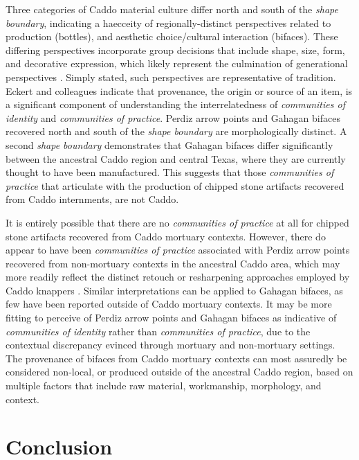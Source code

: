 \documentclass[smallextended]{svjour3}       %
\begin{document}
Three categories of Caddo material culture differ north and south of the
\emph{shape boundary}, indicating a haecceity of regionally-distinct
perspectives related to production (bottles), and aesthetic
choice/cultural interaction (bifaces). These differing perspectives
incorporate group decisions that include shape, size, form, and
decorative expression, which likely represent the culmination of
generational perspectives \cite{RN5610}. Simply stated, such
perspectives are representative of tradition. Eckert and colleagues
\cite{RN8061} indicate that provenance, the origin or source of an item,
is a significant component of understanding the interrelatedness of
\emph{communities of identity} and \emph{communities of practice}.
Perdiz arrow points and Gahagan bifaces recovered north and south of the
\emph{shape boundary} are morphologically distinct. A second \emph{shape
boundary} demonstrates that Gahagan bifaces differ significantly between
the ancestral Caddo region and central Texas, where they are currently
thought to have been manufactured. This suggests that those
\emph{communities of practice} that articulate with the production of
chipped stone artifacts recovered from Caddo internments, are not Caddo.

It is entirely possible that there are no \emph{communities of practice}
at all for chipped stone artifacts recovered from Caddo mortuary
contexts. However, there do appear to have been \emph{communities of
practice} associated with Perdiz arrow points recovered from
non-mortuary contexts in the ancestral Caddo area, which may more
readily reflect the distinct retouch or resharpening approaches employed
by Caddo knappers \cite{RN9364,RN8486}. Similar interpretations can be
applied to Gahagan bifaces, as few have been reported outside of Caddo
mortuary contexts. It may be more fitting to perceive of Perdiz arrow
points and Gahagan bifaces as indicative of \emph{communities of
identity} rather than \emph{communities of practice}, due to the
contextual discrepancy evinced through mortuary and non-mortuary
settings. The provenance of bifaces from Caddo mortuary contexts can
most assuredly be considered non-local, or produced outside of the
ancestral Caddo region, based on multiple factors that include raw
material, workmanship, morphology, and context.

\hypertarget{conclusion}{%
\section{Conclusion}\label{conclusion}}
\end{document}
